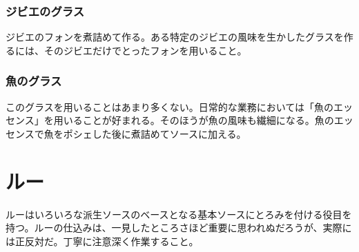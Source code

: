 \begin{recette}
\hypertarget{glace-de-gibier}{%
\subsubsection{ジビエのグラス}\label{glace-de-gibier}}



ジビエのフォンを煮詰めて作る。ある特定のジビエの風味を生かしたグラスを作るには、そのジビエだけでとったフォンを用いること。

\hypertarget{glace-de-poisson}{%
\subsubsection{魚のグラス}\label{glace-de-poisson}}



このグラスを用いることはあまり多くない。日常的な業務においては「魚のエッセンス」を用いることが好まれる。そのほうが魚の風味も繊細になる。魚のエッセンスで魚をポシェした後に煮詰めてソースに加える。
\end{recette}
\hypertarget{roux}{%
\section{ルー}\label{roux}}


 

ルーはいろいろな派生ソースのベースとなる基本ソースにとろみを付ける役目を持つ。ルーの仕込みは、一見したところさほど重要に思われぬだろうが、実際には正反対だ。丁寧に注意深く作業すること。

